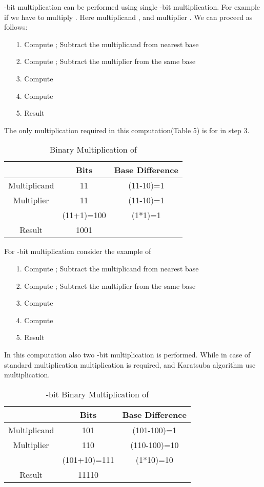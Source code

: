 \documentclass[conference]{IEEEtran}
\begin{document}
-bit multiplication can be performed using single -bit multiplication. For example if we have to multiply . Here multiplicand , and multiplier . We can proceed as follows:
\begin{enumerate}
 \item[1.] Compute ; Subtract the multiplicand from nearest base 
 \item[2.] Compute ; Subtract the multiplier from the same base
 \item[3.] Compute 
 \item[4.] Compute  
 \item[5.] Result  
\end{enumerate}
The only multiplication required in this computation(Table 5) is for  in step 3.
\begin{table}[ht]
\renewcommand{\arraystretch}{1.3}
\caption{Binary Multiplication of }
\label{table 5}
\begin{center}
\begin{tabular}{|c| c| c| } 
\hline
 & Bits & Base Difference    \\ [1ex] \hline\hline 
Multiplicand & 11 & (11-10)=1   \\ \hline
Multiplier & 11 & (11-10)=1  \\ \hline
 & (11+1)=100 & (1*1)=1  \\ \hline
Result & 1001 &   \\ [1ex] \hline

\end{tabular} 
\end{center}
\end{table} 

\indent For -bit multiplication consider the example of 
\begin{enumerate}
 \item[1.] Compute ; Subtract the multiplicand from nearest base 
 \item[2.] Compute ; Subtract the multiplier from the same base
 \item[3.] Compute 
 \item[4.] Compute  
 \item[5.] Result  
\end{enumerate}
In this computation also two -bit multiplication is performed. While in case of standard multiplication  multiplication is required, and Karatsuba algorithm use  multiplication.
\begin{table}[ht]
\renewcommand{\arraystretch}{1.3}
\caption{-bit Binary Multiplication of }
\label{table 6}
\begin{center}
\begin{tabular}{|c| c| c| } 
\hline
 & Bits & Base Difference    \\ [1ex] \hline\hline 
Multiplicand & 101 & (101-100)=1   \\ \hline
Multiplier & 110 & (110-100)=10  \\ \hline
 & (101+10)=111 & (1*10)=10  \\ \hline
Result & 11110 &   \\ [1ex] \hline

\end{tabular} 
\end{center}
\end{table} 
\end{document}
